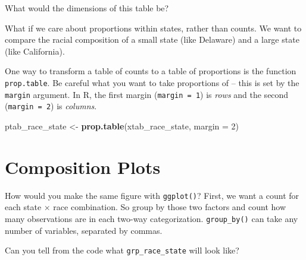 \documentclass[]{book}
\newenvironment{Shaded}{\begin{snugshade}}{\end{snugshade}}
\newcommand{\DataTypeTok}[1]{\textcolor[rgb]{0.13,0.29,0.53}{#1}}
\newcommand{\DecValTok}[1]{\textcolor[rgb]{0.00,0.00,0.81}{#1}}
\newcommand{\KeywordTok}[1]{\textcolor[rgb]{0.13,0.29,0.53}{\textbf{#1}}}
\newcommand{\NormalTok}[1]{#1}
\newcommand{\OperatorTok}[1]{\textcolor[rgb]{0.81,0.36,0.00}{\textbf{#1}}}
\newcommand{\StringTok}[1]{\textcolor[rgb]{0.31,0.60,0.02}{#1}}
\theoremstyle{definition}
\theoremstyle{definition}
\theoremstyle{definition}
\theoremstyle{remark}
\begin{document}
\begin{Shaded}
\end{Shaded}

What would the dimensions of this table be?

What if we care about proportions within states, rather than counts. We want to compare the racial composition of a small state (like Delaware) and a large state (like California).

One way to transform a table of counts to a table of proportions is the function \texttt{prop.table}. Be careful what you want to take proportions of -- this is set by the \texttt{margin} argument. In R, the first margin (\texttt{margin\ =\ 1}) is \emph{rows} and the second (\texttt{margin\ =\ 2}) is \emph{columns}.

\begin{Shaded}
\begin{Highlighting}[]
\NormalTok{ptab_race_state <-}\StringTok{ }\KeywordTok{prop.table}\NormalTok{(xtab_race_state, }\DataTypeTok{margin =} \DecValTok{2}\NormalTok{)}
\end{Highlighting}
\end{Shaded}

\hypertarget{composition-plots}{%
\section{Composition Plots}\label{composition-plots}}

How would you make the same figure with \texttt{ggplot()}? First, we want a count for each state \(\times\) race combination. So group by those two factors and count how many observations are in each two-way categorization. \texttt{group\_by()} can take any number of variables, separated by commas.

\begin{Shaded}
\end{Shaded}

Can you tell from the code what \texttt{grp\_race\_state} will look like?
\end{document}
